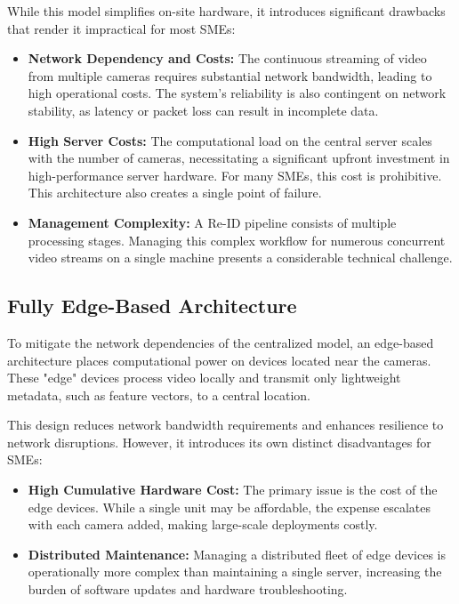 \documentclass[../main.tex]{subfiles}
\begin{document}
While this model simplifies on-site hardware, it introduces significant drawbacks that render it impractical for most SMEs:
\begin{itemize}
    \item \textbf{Network Dependency and Costs:} The continuous streaming of video from multiple cameras requires substantial network bandwidth, leading to high operational costs. The system's reliability is also contingent on network stability, as latency or packet loss can result in incomplete data.
    \item \textbf{High Server Costs:} The computational load on the central server scales with the number of cameras, necessitating a significant upfront investment in high-performance server hardware. For many SMEs, this cost is prohibitive. This architecture also creates a single point of failure.
    \item \textbf{Management Complexity:} A Re-ID pipeline consists of multiple processing stages. Managing this complex workflow for numerous concurrent video streams on a single machine presents a considerable technical challenge.
\end{itemize}

\subsection{Fully Edge-Based Architecture}
To mitigate the network dependencies of the centralized model, an edge-based architecture places computational power on devices located near the cameras. These "edge" devices process video locally and transmit only lightweight metadata, such as feature vectors, to a central location.

This design reduces network bandwidth requirements and enhances resilience to network disruptions. However, it introduces its own distinct disadvantages for SMEs:
\begin{itemize}
    \item \textbf{High Cumulative Hardware Cost:} The primary issue is the cost of the edge devices. While a single unit may be affordable, the expense escalates with each camera added, making large-scale deployments costly.
    \item \textbf{Distributed Maintenance:} Managing a distributed fleet of edge devices is operationally more complex than maintaining a single server, increasing the burden of software updates and hardware troubleshooting.
\end{itemize}
\end{document}
